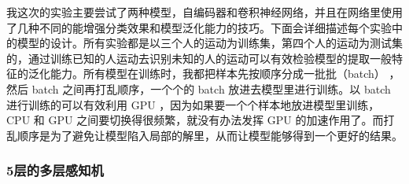 我这次的实验主要尝试了两种模型，自编码器和卷积神经网络，并且在网络里使用了几种不同的能增强分类效果和模型泛化能力的技巧。下面会详细描述每个实验中的模型的设计。所有实验都是以三个人的运动为训练集，第四个人的运动为测试集的，通过训练已知的人运动去识别未知的人的运动可以有效检验模型的提取一般特征的泛化能力。所有模型在训练时，我都把样本先按顺序分成一批批（batch）
，然后 batch 之间再打乱顺序，一个个的 batch 放进去模型里进行训练。以
batch 进行训练的可以有效利用 GPU
，因为如果要一个个样本地放进模型里训练， CPU 和 GPU
之间要切换得很频繁，就没有办法发挥 GPU
的加速作用了。而打乱顺序是为了避免让模型陷入局部的解里，从而让模型能够得到一个更好的结果。

\subsubsection{5层的多层感知机}\label{ux5c42ux7684ux591aux5c42ux611fux77e5ux673a}

